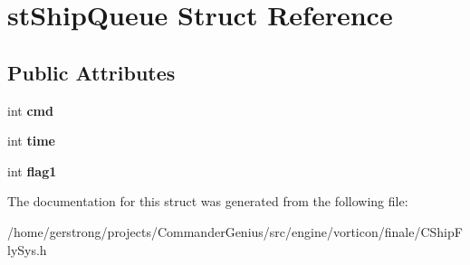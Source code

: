 \hypertarget{structst_ship_queue}{
\section{stShipQueue Struct Reference}
\label{structst_ship_queue}
}
\subsection*{Public Attributes}
\begin{DoxyCompactItemize}
\item 
\hypertarget{structst_ship_queue_a018240ad091b65c395769396b17af0d5}{
int {\bfseries cmd}}
\label{structst_ship_queue_a018240ad091b65c395769396b17af0d5}

\item 
\hypertarget{structst_ship_queue_a2414f018635e7dd728464ebcc5038d74}{
int {\bfseries time}}
\label{structst_ship_queue_a2414f018635e7dd728464ebcc5038d74}

\item 
\hypertarget{structst_ship_queue_a41594b1ee24e884418f5804b80021c4a}{
int {\bfseries flag1}}
\label{structst_ship_queue_a41594b1ee24e884418f5804b80021c4a}

\end{DoxyCompactItemize}


The documentation for this struct was generated from the following file:\begin{DoxyCompactItemize}
\item 
/home/gerstrong/projects/CommanderGenius/src/engine/vorticon/finale/CShipFlySys.h\end{DoxyCompactItemize}
